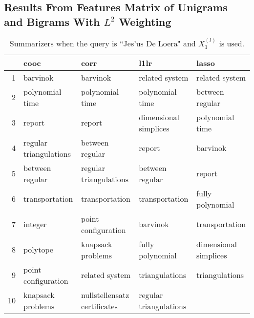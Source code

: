 \documentclass{article}
\begin{document}
\subsection{Results From Features Matrix of Unigrams and Bigrams With $L^2$ Weighting}
\par
\begin{table}[H]
\begin{center}
\begin{tabular}{|r|llll|}
\hline
& cooc & corr & l1lr & lasso \\
\hline
1 & barvinok & barvinok & related system & related system \\
2 & polynomial time & polynomial time & polynomial time & between regular \\
3 & report & report & dimensional simplices & polynomial time \\
4 & regular triangulations & between regular & report & barvinok \\
5 & between regular & regular triangulations & between regular & report \\
6 & transportation & transportation & transportation & fully polynomial \\
7 & integer & point configuration & barvinok & transportation \\
8 & polytope & knapsack problems & fully polynomial & dimensional simplices \\
9 & point configuration & related system & triangulations & triangulations \\
10 & knapsack problems & nullstellensatz certificates & regular triangulations & \\
\hline
\end{tabular}
\end{center}
\caption{Summarizers when the query is ``Jes\a'us De Loera" and $X_1^{(l)}$ is used.}
\end{table}
\par
\end{document}

